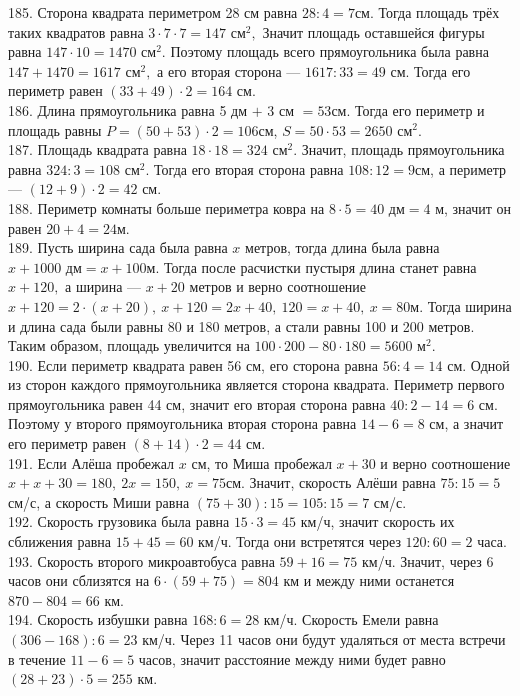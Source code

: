 \documentclass[12pt]{article}
\begin{document}
185. Сторона квадрата периметром 28 см равна $28:4=7$см. Тогда площадь трёх таких квадратов равна $3\cdot7\cdot7=147\text{ см}^2,$ Значит площадь оставшейся фигуры равна $147\cdot10=1470\text{ см}^2.$ Поэтому площадь всего прямоугольника была равна $147+1470=1617\text{ см}^2,$ а его вторая сторона --- $1617:33=49$ см. Тогда его периметр равен $(33+49)\cdot2=164$ см.\\
186. Длина прямоугольника равна 5 дм $+$ 3 см $=53$см. Тогда его периметр и площадь равны $P=(50+53)\cdot2=106$см, $S=50\cdot53=2650\text{ см}^2.$\\
187. Площадь квадрата равна $18\cdot18=324\text{ см}^2.$ Значит, площадь прямоугольника равна $324:3=108\text{ см}^2.$ Тогда его вторая сторона равна $108:12=9$см, а периметр --- $(12+9)\cdot2=42$ см.\\
188. Периметр комнаты больше периметра ковра на $8\cdot5=40\text{ дм}=4$ м, значит он равен $20+4=24$м.\\
189. Пусть ширина сада была равна $x$ метров, тогда длина была равна $x+1000\text{ дм}=x+100$м. Тогда после расчистки пустыря длина станет равна $x+120,$ а ширина --- $x+20$ метров и верно соотношение $x+120=2\cdot(x+20),\ x+120=2x+40,\ 120=x+40,\ x=80$м. Тогда ширина и длина сада были равны 80 и 180 метров, а стали равны 100 и 200 метров. Таким образом, площадь увеличится на $100\cdot200-80\cdot180=5600\text{ м}^2.$\\
190. Если периметр квадрата равен 56 см, его сторона равна $56:4=14$ см. Одной из сторон каждого прямоугольника является сторона квадрата. Периметр первого прямоугольника равен 44 см, значит его вторая сторона равна $40:2-14=6$ см. Поэтому у второго прямоугольника вторая сторона равна $14-6=8$ см, а значит его периметр равен $(8+14)\cdot2=44$ см.\\
191. Если Алёша пробежал $x$ см, то Миша пробежал $x+30$ и верно соотношение $x+x+30=180,\ 2x=150,\ x=75$см. Значит, скорость Алёши равна $75:15=5$ см/с, а скорость Миши равна $(75+30):15=105:15=7$ см/с.\\
192. Скорость грузовика была равна $15\cdot3=45$ км/ч, значит скорость их сближения равна $15+45=60$ км/ч. Тогда они встретятся через $120:60=2$ часа.\\
193. Скорость второго микроавтобуса равна $59+16=75$ км/ч. Значит, через 6 часов они сблизятся на $6\cdot(59+75)=804$ км и между ними останется $870-804=66$ км.\\
194. Скорость избушки равна $168:6=28$ км/ч. Скорость Емели равна $(306-168):6=23$ км/ч. Через 11 часов они будут удаляться от места встречи в течение $11-6=5$ часов, значит расстояние между ними будет равно $(28+23)\cdot5=255$ км.\\
\end{document}
